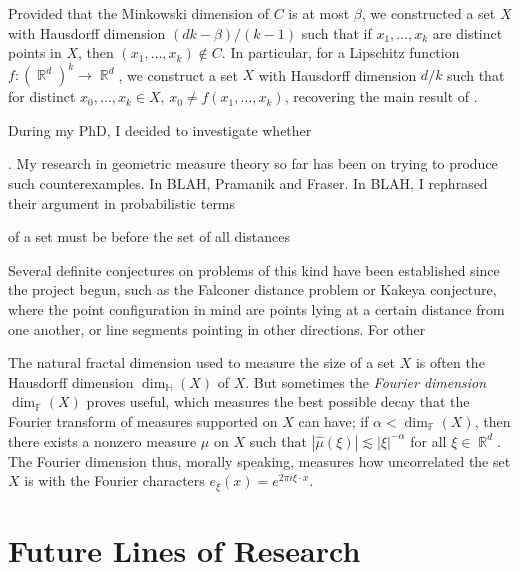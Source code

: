 \documentclass[12pt]{article}
\DeclareMathOperator{\RR}{\mathbb{R}}
\begin{document}
Provided that the Minkowski dimension of $C$ is at most $\beta$, we constructed a set $X$ with Hausdorff dimension $(dk - \beta)/(k-1)$ such that if $x_1,\dots,x_k$ are distinct points in $X$, then $(x_1,\dots,x_k) \not \in C$. In particular, for a Lipschitz function $f: (\RR^d)^k \to \RR^d$, we construct a set $X$ with Hausdorff dimension $d/k$ such that for distinct $x_0,\dots,x_k \in X$, $x_0 \neq f(x_1,\dots,x_k)$, recovering the main result of \cite{FraserPramanik}.



During my PhD, I decided to investigate whether 

. My research in geometric measure theory so far has been on trying to produce such counterexamples. In BLAH, Pramanik and Fraser. In BLAH, I rephrased their argument in probabilistic terms 

 of a set must be before the set of all distances 

Several definite conjectures on problems of this kind have been established since the project begun, such as the Falconer distance problem or Kakeya conjecture, where the point configuration in mind are points lying at a certain distance from one another, or line segments pointing in other directions. For other

The natural fractal dimension used to measure the size of a set $X$ is often the Hausdorff dimension $\dim_{\mathbb{H}}(X)$ of $X$. But sometimes the \emph{Fourier dimension} $\dim_{\mathbb{F}}(X)$ proves useful, which measures the best possible decay that the Fourier transform of measures supported on $X$ can have; if $\alpha < \dim_{\mathbb{F}}(X)$, then there exists a nonzero measure $\mu$ on $X$ such that $|\widehat{\mu}(\xi)| \lesssim |\xi|^{-\alpha}$ for all $\xi \in \RR^d$. The Fourier dimension thus, morally speaking, measures how uncorrelated the set $X$ is with the Fourier characters $e_\xi(x) = e^{2 \pi i \xi \cdot x}$.

\section*{Future Lines of Research}
\end{document}

